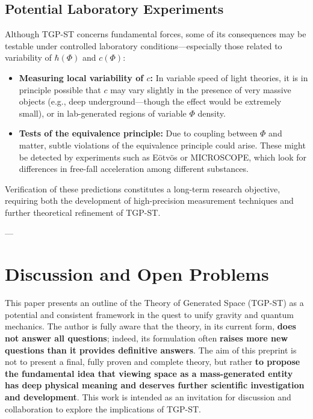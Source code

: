 \documentclass[11pt,a4paper]{article}
\begin{document}
\subsection{Potential Laboratory Experiments}
Although TGP-ST concerns fundamental forces, some of its consequences may be testable under controlled laboratory conditions—especially those related to variability of $\hbar(\Phi)$ and $c(\Phi)$:
\begin{itemize}
    \item \textbf{Measuring local variability of $c$:} In variable speed of light theories, it is in principle possible that $c$ may vary slightly in the presence of very massive objects (e.g., deep underground—though the effect would be extremely small), or in lab-generated regions of variable $\Phi$ density.
    \item \textbf{Tests of the equivalence principle:} Due to coupling between $\Phi$ and matter, subtle violations of the equivalence principle could arise. These might be detected by experiments such as Eötvös or MICROSCOPE, which look for differences in free-fall acceleration among different substances.
\end{itemize}

Verification of these predictions constitutes a long-term research objective, requiring both the development of high-precision measurement techniques and further theoretical refinement of TGP-ST.

---

\section{Discussion and Open Problems}
\label{sec:OtwarteProblemy}

This paper presents an outline of the Theory of Generated Space (TGP-ST) as a potential and consistent framework in the quest to unify gravity and quantum mechanics. The author is fully aware that the theory, in its current form, \textbf{does not answer all questions}; indeed, its formulation often \textbf{raises more new questions than it provides definitive answers}. The aim of this preprint is not to present a final, fully proven and complete theory, but rather \textbf{to propose the fundamental idea that viewing space as a mass-generated entity has deep physical meaning and deserves further scientific investigation and development}. This work is intended as an invitation for discussion and collaboration to explore the implications of TGP-ST.
\end{document}
